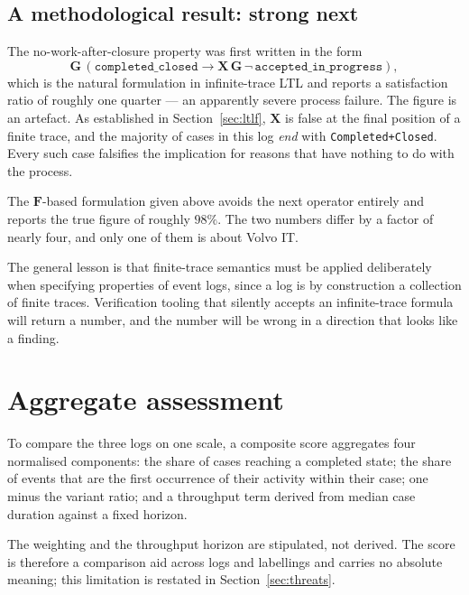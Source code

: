 \documentclass[12pt,a4paper]{article}
\newcommand{\act}[1]{\texttt{#1}}
\begin{document}
\subsection{A methodological result: strong next}\label{sec:strongx}

The no-work-after-closure property was first written in the form
\[
  \mathbf{G}\,(\texttt{completed\_closed} \rightarrow
  \mathbf{X}\,\mathbf{G}\,\neg\,\texttt{accepted\_in\_progress}),
\]
which is the natural formulation in infinite-trace LTL and reports a
satisfaction ratio of roughly one quarter --- an apparently severe process
failure. The figure is an artefact. As established in Section~\ref{sec:ltlf},
$\mathbf{X}$ is false at the final position of a finite trace, and the majority
of cases in this log \emph{end} with \act{Completed+Closed}. Every such case
falsifies the implication for reasons that have nothing to do with the process.

The $\mathbf{F}$-based formulation given above avoids the next operator entirely
and reports the true figure of roughly $98\%$. The two numbers differ by a
factor of nearly four, and only one of them is about Volvo IT.

The general lesson is that finite-trace semantics must be applied deliberately
when specifying properties of event logs, since a log is by construction a
collection of finite traces. Verification tooling that silently accepts an
infinite-trace formula will return a number, and the number will be wrong in a
direction that looks like a finding.

\section{Aggregate assessment}\label{sec:health}

To compare the three logs on one scale, a composite score aggregates four
normalised components: the share of cases reaching a completed state; the share
of events that are the first occurrence of their activity within their case;
one minus the variant ratio; and a throughput term derived from median case
duration against a fixed horizon.

\begin{table}[H]
\centering
\small

\caption{Composite score and its components across the three logs. Higher is
better on every component.}
\label{tab:health}
\end{table}

The weighting and the throughput horizon are stipulated, not derived. The score
is therefore a comparison aid across logs and labellings and carries no absolute
meaning; this limitation is restated in Section~\ref{sec:threats}.
\end{document}
